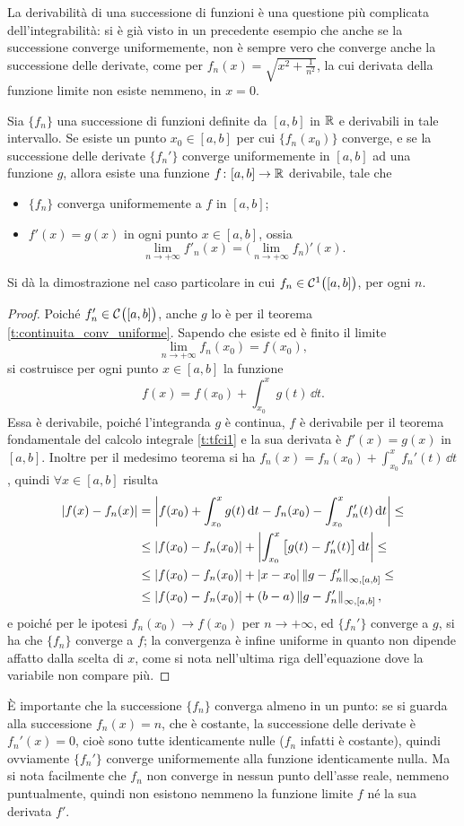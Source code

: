 La derivabilità di una successione di funzioni è una questione più complicata dell'integrabilità: si è già visto in un precedente esempio che anche se la successione converge uniformemente, non è sempre vero che converge anche la successione delle derivate, come per $f_n(x)=\sqrt{x^2+\frac1{n^2}}$, la cui derivata della funzione limite non esiste nemmeno, in $x=0$.
\begin{teorema} \label{t:scambio_derivata_limite}
Sia $\{f_n\}$ una successione di funzioni definite da $[a,b]$ in $\mathbb{R}$ e derivabili in tale intervallo. Se esiste un punto $x_0\in[a,b]$ per cui $\{f_n(x_0)\}$ converge, e se la successione delle derivate $\{f_n'\}$ converge uniformemente in $[a,b]$ ad una funzione $g$, allora esiste una funzione $f\colon[a,b]\to\mathbb{R}$ derivabile, tale che
\begin{itemize}
\item $\{f_n\}$ converga uniformemente a $f$ in $[a,b]$;
\item $f'(x)=g(x)$ in ogni punto $x\in[a,b]$, ossia
\[
\lim_{n\to+\infty}f'_n(x)=\Big(\lim_{n\to+\infty}f_n\Big)'(x).
\]
\end{itemize}
\end{teorema}
Si dà la dimostrazione nel caso particolare in cui $f_n\in\mathcal{C}^{{1}}\big([a,b]\big)$, per ogni $n$.
\begin{proof}
Poiché $f_n'\in\mathcal{C}^{{}}\big([a,b]\big)$, anche $g$ lo è per il teorema \ref{t:continuita_conv_uniforme}. Sapendo che esiste ed è finito il limite
\[
\lim_{n\to+\infty}f_n(x_0)=f(x_0),
\]
si costruisce per ogni punto $x\in[a,b]$ la funzione
\[
f(x)=f(x_0)+\int_{x_0}^xg(t)\,\dd t.
\]
Essa è derivabile, poiché l'integranda $g$ è continua, $f$ è derivabile per il teorema fondamentale del calcolo integrale \ref{t:tfci1} e la sua derivata è $f'(x)=g(x)$ in $[a,b]$. Inoltre per il medesimo teorema si ha $f_n(x)=f_n(x_0)+\int_{x_0}^xf_n'(t)\,\dd t$, quindi $\forall x\in[a,b]$ risulta
\[\begin{split}
\left|{f(x)-f_n(x)}\right|	&=\left|{f(x_0)+\int_{x_0}^xg(t)\,\textup{d} t-f_n(x_0)-\int_{x_0}^xf_n'(t)\,\textup{d} t}\right|\leq\\
				&\leq\left|{f(x_0)-f_n(x_0)}\right|+\left|{\int_{x_0}^x\big[g(t)-f_n'(t)\big]\,\textup{d} t}\right|\leq\\
				&\leq\left|{f(x_0)-f_n(x_0)}\right|+\left|{x-x_0}\right|\left\|{g-f_n'}\right\|_{\infty,[a,b]}\leq\\
				&\leq\left|{f(x_0)-f_n(x_0)}\right|+(b-a)\left\|{g-f_n'}\right\|_{\infty,[a,b]},
\end{split}\]
e poiché per le ipotesi $f_n(x_0)\to f(x_0)$ per $n\to+\infty$, ed $\{f_n'\}$ converge a $g$, si ha che $\{f_n\}$ converge a $f$; la convergenza è infine uniforme in quanto non dipende affatto dalla scelta di $x$, come si nota nell'ultima riga dell'equazione dove la variabile non compare più.
\end{proof}
È importante che la successione $\{f_n\}$ converga almeno in un punto: se si guarda alla successione $f_n(x)=n$, che è costante, la successione delle derivate è $f_n'(x)=0$, cioè sono tutte identicamente nulle ($f_n$ infatti è costante), quindi ovviamente $\{f_n'\}$ converge uniformemente alla funzione identicamente nulla. Ma si nota facilmente che $f_n$ non converge in nessun punto dell'asse reale, nemmeno puntualmente, quindi non esistono nemmeno la funzione limite $f$ né la sua derivata $f'$.

